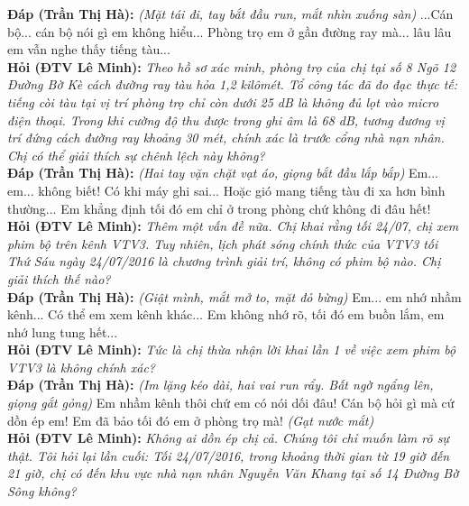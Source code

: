 \documentclass[12pt,a4paper]{article}
\begin{document}
\noindent\textbf{Đáp (Trần Thị Hà):} \textit{(Mặt tái đi, tay bắt đầu run, mắt nhìn xuống sàn)} ...Cán bộ... cán bộ nói gì em không hiểu... Phòng trọ em ở gần đường ray mà... lâu lâu em vẫn nghe thấy tiếng tàu...\\[0.35cm]


\noindent\textbf{Hỏi (ĐTV Lê Minh):} \textit{Theo hồ sơ xác minh, phòng trọ của chị tại số 8 Ngõ 12 Đường Bờ Kè cách đường ray tàu hỏa 1,2 kilômét. Tổ công tác đã đo đạc thực tế: tiếng còi tàu tại vị trí phòng trọ chỉ còn dưới 25 dB là không đủ lọt vào micro điện thoại. Trong khi cường độ thu được trong ghi âm là 68 dB, tương đương vị trí đứng cách đường ray khoảng 30 mét, chính xác là trước cổng nhà nạn nhân. Chị có thể giải thích sự chênh lệch này không?}\\[0.15cm]

\noindent\textbf{Đáp (Trần Thị Hà):} \textit{(Hai tay vặn chặt vạt áo, giọng bắt đầu lắp bắp)} Em... em... không biết! Có khi máy ghi sai... Hoặc gió mang tiếng tàu đi xa hơn bình thường... Em khẳng định tối đó em chỉ ở trong phòng chứ không đi đâu hết!\\[0.35cm]


\noindent\textbf{Hỏi (ĐTV Lê Minh):} \textit{Thêm một vấn đề nữa. Chị khai rằng tối 24/07, chị xem phim bộ trên kênh VTV3. Tuy nhiên, lịch phát sóng chính thức của VTV3 tối Thứ Sáu ngày 24/07/2016 là chương trình giải trí, không có phim bộ nào. Chị giải thích thế nào?}\\[0.15cm]

\noindent\textbf{Đáp (Trần Thị Hà):} \textit{(Giật mình, mắt mở to, mặt đỏ bừng)} Em... em nhớ nhầm kênh... Có thể em xem kênh khác... Em không nhớ rõ, tối đó em buồn lắm, em nhớ lung tung hết...\\[0.35cm]


\noindent\textbf{Hỏi (ĐTV Lê Minh):} \textit{Tức là chị thừa nhận lời khai lần 1 về việc xem phim bộ VTV3 là không chính xác?}\\[0.15cm]

\noindent\textbf{Đáp (Trần Thị Hà):} \textit{(Im lặng kéo dài, hai vai run rẩy. Bất ngờ ngẩng lên, giọng gắt gỏng)} Em nhầm kênh thôi chứ em có nói dối đâu! Cán bộ hỏi gì mà cứ dồn ép em! Em đã bảo tối đó em ở phòng trọ mà! \textit{(Gạt nước mắt)}\\[0.35cm]


\noindent\textbf{Hỏi (ĐTV Lê Minh):} \textit{Không ai dồn ép chị cả. Chúng tôi chỉ muốn làm rõ sự thật. Tôi hỏi lại lần cuối: Tối 24/07/2016, trong khoảng thời gian từ 19 giờ đến 21 giờ, chị có đến khu vực nhà nạn nhân Nguyễn Văn Khang tại số 14 Đường Bờ Sông không?}\\[0.15cm]
\end{document}
